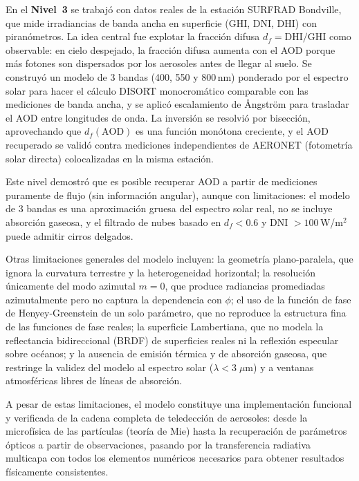 \documentclass[a4paper,11pt]{article}
\begin{document}
En el \textbf{Nivel~3} se trabaj\'o con datos reales de la estaci\'on
SURFRAD Bondville, que mide irradiancias de banda ancha en superficie
(GHI, DNI, DHI) con piranómetros. La idea central fue explotar la
fracci\'on difusa $d_f = \text{DHI}/\text{GHI}$ como observable: en
cielo despejado, la fracci\'on difusa aumenta con el AOD porque m\'as
fotones son dispersados por los aerosoles antes de llegar al suelo.
Se construy\'o un modelo de 3 bandas (400, 550 y 800\,nm) ponderado por
el espectro solar para hacer el c\'alculo DISORT monocrom\'atico comparable
con las mediciones de banda ancha, y se aplic\'o escalamiento de \AA ngstr\"om
para trasladar el AOD entre longitudes de onda. La inversi\'on se
resolvi\'o por bisecci\'on, aprovechando que $d_f(\text{AOD})$ es una
funci\'on mon\'otona creciente, y el AOD recuperado se valid\'o contra
mediciones independientes de AERONET (fotometr\'ia solar directa)
colocalizadas en la misma estaci\'on.

Este nivel demostr\'o que es posible recuperar AOD a partir de mediciones
puramente de flujo (sin informaci\'on angular), aunque con limitaciones:
el modelo de 3 bandas es una aproximaci\'on gruesa del espectro solar real,
no se incluye absorci\'on gaseosa, y el filtrado de nubes basado en
$d_f < 0.6$ y DNI $> 100$\,W/m$^2$ puede admitir cirros delgados.

Otras limitaciones generales del modelo incluyen: la geometr\'ia
plano-paralela, que ignora la curvatura terrestre y la heterogeneidad
horizontal; la resoluci\'on \'unicamente del modo azimutal $m = 0$, que
produce radiancias promediadas azimutalmente pero no captura la dependencia
con $\phi$; el uso de la funci\'on de fase de Henyey-Greenstein de un
solo par\'ametro, que no reproduce la estructura fina de las funciones de
fase reales; la superficie Lambertiana, que no modela la reflectancia
bidireccional (BRDF) de superficies reales ni la reflexi\'on especular
sobre oc\'eanos; y la ausencia de emisi\'on t\'ermica y de absorci\'on
gaseosa, que restringe la validez del modelo al espectro solar
($\lambda < 3\;\mu$m) y a ventanas atmosf\'ericas libres de l\'ineas
de absorci\'on.

A pesar de estas limitaciones, el modelo constituye una implementaci\'on
funcional y verificada de la cadena completa de teledecci\'on de aerosoles:
desde la microf\'isica de las part\'iculas (teor\'ia de Mie) hasta la
recuperaci\'on de par\'ametros \'opticos a partir de observaciones, pasando
por la transferencia radiativa multicapa con todos los elementos
num\'ericos necesarios para obtener resultados f\'isicamente consistentes.
\end{document}
